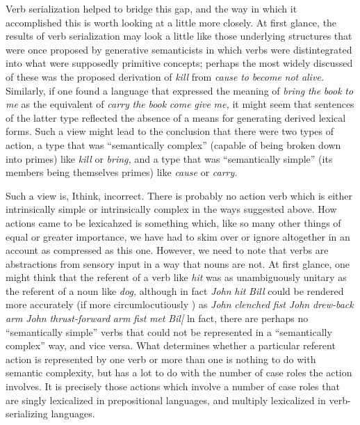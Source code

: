 Verb serialization helped to bridge this gap, and the way in which it accomplished this is worth looking at a little more closely. At first glance, the results of verb serialization may look a little like those underlying structures that were once proposed by generative semanti\-cists in which verbs were distintegrated into what were supposedly primitive concepts; perhaps the most widely discussed of these was the
proposed derivation of \textit{kill} from \textit{cause} \textit{to} \textit{become} \textit{not} \textit{alive.} Similarly,
if one found a language that expressed the meaning of \textit{bring} \textit{the} \textit{book} \textit{to} \textit{me} as the equivalent of \textit{carry} \textit{the} \textit{book} \textit{come} \textit{give} \textit{me,} it might seem that sentences of the latter type reflected the absence of a means for generating derived lexical forms. Such a view might lead to the conclu\-sion that there were two types of action, a type that was ``semantically complex'' (capable of being broken down into primes) like \textit{kill }or \textit{bring,} and a type that was ``semantically simple'' (its members being themselves primes) like \textit{cause} or \textit{carry.}

Such a view is, Ithink, incorrect. There is probably no action verb which is either intrinsically simple or intrinsically complex in the ways suggested above. How actions came to be lexicahzed is something which, like so many other things of equal or greater importance, we
have had to skim over or ignore altogether in an account as compressed as this one. However, we need to note that verbs are abstractions from sensory input in a way that nouns are not. At first glance, one might think that the referent of a verb like \textit{hit} was as unambiguously unitary as the referent of a noun like \textit{dog,} although in fact \textit{John} \textit{hit} \textit{Bill} could be rendered more accurately (if more circumlocutiously ) as \textit{John} \textit{clenched} \textit{fist} \textit{John} \textit{drew-back} \textit{a}\textit{r}\textit{m} \textit{John} \textit{thrust}\textit{{}-}\textit{forward} \textit{arm} \textit{fist} \textit{met} \textit{Bil[} ln fact, there are perhaps no ``semantically simple'' verbs that could not be represented in a ``semantically complex'' way, and vice versa. What determines whether a particular referent action is repre\-sented by one verb or more than one is nothing to do with semantic complexity, but has a lot to do with the number of case roles the action involves. It is precisely those actions which involve a number of case roles that are singly lexicalized in prepositional languages, and multiply lexicalized in verb-serializing languages.

